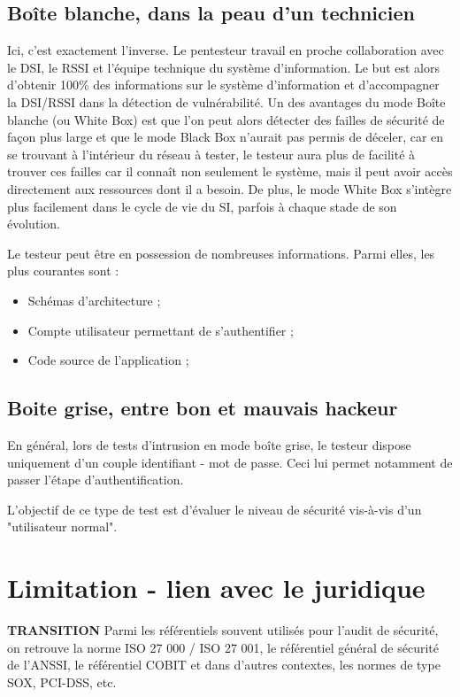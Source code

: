 \documentclass[a4paper]{memoir}
\begin{document}
\subsection{Boîte blanche, dans la peau d'un technicien}

 Ici, c’est exactement l’inverse. Le pentesteur travail en proche collaboration avec le DSI, le RSSI et l’équipe technique du système d’information. Le but est alors d’obtenir 100\% des informations sur le système d’information et d’accompagner la DSI/RSSI dans la détection de vulnérabilité. Un des avantages du mode Boîte blanche (ou White Box) est que l’on peut alors détecter des failles de sécurité de façon plus large et que le mode Black Box n’aurait pas permis de déceler, car en se trouvant à l'intérieur du réseau à tester, le testeur aura plus de facilité à trouver ces failles car il connaît non seulement le système, mais il peut avoir accès directement aux ressources dont il a besoin. De plus, le mode White Box s’intègre plus facilement dans le cycle de vie du SI, parfois à chaque stade de son évolution. 

Le testeur peut être en possession de nombreuses informations. Parmi elles, les plus courantes sont :

\begin{itemize}
   \item Schémas d'architecture ;
   \item Compte utilisateur permettant de s'authentifier ;
   \item Code source de l'application ;
\end{itemize}



\subsection{Boite grise, entre bon et mauvais hackeur}

En général, lors de tests d'intrusion en mode boîte grise, le testeur dispose uniquement d'un couple identifiant - mot de passe. Ceci lui permet notamment de passer l'étape d'authentification.

L'objectif de ce type de test est d'évaluer le niveau de sécurité vis-à-vis d'un "utilisateur normal".


\section{Limitation - lien avec le juridique}

\textbf{TRANSITION}
Parmi les référentiels souvent utilisés pour l’audit de sécurité, on retrouve la norme ISO 27 000 / ISO 27 001, le référentiel général de sécurité de l’ANSSI, le référentiel COBIT et dans d’autres contextes, les normes de type SOX, PCI-DSS, etc.
\end{document}
